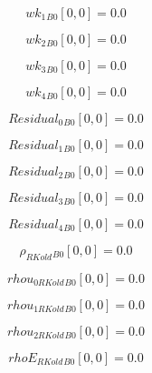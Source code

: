 \documentclass{article}
\begin{document}
\begin{dmath}{wk_{1}{_{B0}}}[{0,0}] = 0.0\end{dmath}

\begin{dmath}{wk_{2}{_{B0}}}[{0,0}] = 0.0\end{dmath}

\begin{dmath}{wk_{3}{_{B0}}}[{0,0}] = 0.0\end{dmath}

\begin{dmath}{wk_{4}{_{B0}}}[{0,0}] = 0.0\end{dmath}

\begin{dmath}{Residual_{0}{_{B0}}}[{0,0}] = 0.0\end{dmath}

\begin{dmath}{Residual_{1}{_{B0}}}[{0,0}] = 0.0\end{dmath}

\begin{dmath}{Residual_{2}{_{B0}}}[{0,0}] = 0.0\end{dmath}

\begin{dmath}{Residual_{3}{_{B0}}}[{0,0}] = 0.0\end{dmath}

\begin{dmath}{Residual_{4}{_{B0}}}[{0,0}] = 0.0\end{dmath}

\begin{dmath}{\rho_{RKold}{_{B0}}}[{0,0}] = 0.0\end{dmath}

\begin{dmath}{rhou_{0 RKold}{_{B0}}}[{0,0}] = 0.0\end{dmath}

\begin{dmath}{rhou_{1 RKold}{_{B0}}}[{0,0}] = 0.0\end{dmath}

\begin{dmath}{rhou_{2 RKold}{_{B0}}}[{0,0}] = 0.0\end{dmath}

\begin{dmath}{rhoE_{RKold}{_{B0}}}[{0,0}] = 0.0\end{dmath}
\end{document}
